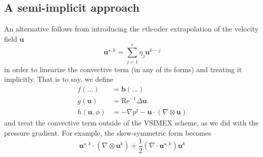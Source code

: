\documentclass[]{scrartcl}
\newcommand{\bs}[1]{\boldsymbol{#1}}
\begin{document}
\subsection{A semi-implicit approach}\label{Sec:SemiImplicit}
An alternative follows from introducing the $r$th-oder extrapolation of the velocity field $\bs{u}$ 
\begin{equation*}
\bs{u}^{\star, k} = \sum_{j=1}^{r} \eta_j \bs{u}^{k-j}
\end{equation*}
in order to linearize the convective term (in any of its forms) and treating it implicitly. That is to say, we define
\begin{equation*}
\begin{aligned}
f(\dots) &= \bs{b}(\dots) \\
g(\bs{u}) &= \textrm{Re}^{-1} \Delta \bs{u}\\
h(\bs{u}, \phi) &= -\nabla p^\sharp - \bs{u} \cdot (\nabla \otimes \bs{u})
\end{aligned}
\end{equation*}
and treat the convective term outside of the VSIMEX scheme, as we did with the pressure gradient. For example, the skew-symmetric form becomes
\begin{equation*}
	\bs{u}^{\star, k} \cdot (\nabla \otimes \bs{u}^{k}) + \dfrac{1}{2} (\nabla \cdot \bs{u}^{\star, k})\bs{u}^{k}
\end{equation*}
\end{document}
